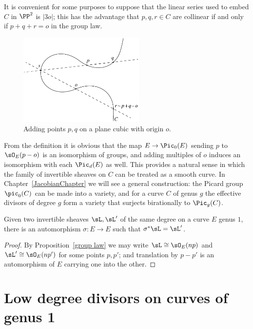 It is convenient for some purposes to suppose that the linear series used to embed $C$ in $\PP^2$ is $|3o|$; this
has the advantage that $p,q,r\in C$ are collinear if and only if $p+q+r =o$ in the group law.

\begin{figure}
\centerline {\includegraphics[height=1.8in]{"main/Fig03-2"}}
\vskip-6pt
 \caption{Adding points $p, q$ on a plane cubic with origin $o$.}
\label{group law on cubic}
\end{figure}

\begin{remark}
From the definition it is obvious that
the map
$E \to \Pic_0(E)$ sending $p$ to $\sO_E(p-o)$ is an isomorphism of groups, and adding multiples of $o$
induces an isomorphism with each $\Pic_d(E)$ as well. This provides a natural sense
in which the family of invertible sheaves on $C$ can be treated as a smooth curve.
 In Chapter~\ref{JacobianChapter} we will see a general construction:
 the
Picard group
%
$\pic_0(C)$ can be made into
a variety, and for a curve $C$ of genus $g$ the effective divisors
of degree $g$ form a variety that surjects birationally to $\Pic_g(C)$.
\end{remark}


\begin{corollary}\label{equivalence of sheaves}
Given two invertible sheaves $\sL, \sL'$ of the same degree on a curve
%
$E$ genus $1$, there is an automorphism $\sigma: E\to E$
such that $\sigma^*\sL = \sL'$.
\end{corollary}

\begin{proof}
By Proposition~\ref{group law} we may write $\sL \cong \sO_E(np)$ and $\sL'\cong \sO_E(np')$ for some points $p,p'$; and translation by $p-p'$
is an automorphism of $E$ carrying one into the other.
\end{proof}


\section{Low degree divisors on curves of genus 1}

